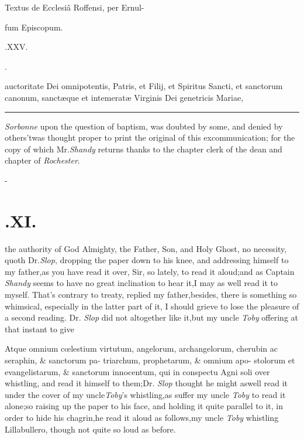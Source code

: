 \documentclass{article}
\begin{document}
\null\smallskip
\centerline{Textus de Ecclesiâ Roffensi, per Ernul-}
\centerline{fum Episcopum.}
\bigskip
\centerline{\large{}.\quad XXV.}
\bigskip
\centerline{\large{}.}

 auctoritate Dei omnipotentis, Patris, et Filij, et Spiritus Sancti, et
sanctorum canonum, sanctæque et intemeratæ Virginis Dei genetricis Mariae,

\vfill
\bgroup\fontsize{8}{10}\selectfont
\hrule
{} \textit{Sor\-bonne} upon the question of
baptism, was doubted by some, and denied by others\tsh ’twas
thought proper to print the original of this excommunication; for the copy of
which Mr.\@ \textit{Shandy} returns thanks to the chapter clerk of the dean and
chapter of \textit{Rochester}.\par
\egroup
{}
\newpage
\null\kern-\baselineskip
\section{.\quad  XI.}

the authority of God Almighty, the Father, Son, and Holy Ghost,
no necessity, quoth Dr.\@ \textit{Slop}, dropping the paper down to his knee, and
addressing himself to my father,\tsh as you have read it over, Sir, so lately, to
read it aloud;\tsk\break and as Captain \textit{Shandy} seems to have no great inclination
to hear it,\tsh I may as well read it to myself. That’s contrary to treaty, replied
my father,\tsk besides, there is something so whimsical, especially in the latter
part of it, I should grieve to lose the pleasure of a second reading.  Dr.\@
\textit{Slop} did not altogether like it,\tsh but my uncle \textit{Toby} offering at
that instant to give

\null\vfill
\quad\tsh Atque omnium cœlestium\break
virtutum, angelorum, archangelorum,\break
{}\break
cherubin ac seraphin, \& sanctorum pa-\break
triarchum, prophetarum, \& omnium apo-\break
stolorum et evangelistarum, \& sanctorum\break
innocentum, qui in conspectu Agni soli
over whistling, and read it himself to them;\tsh Dr.\@
\textit{Slop} thought he might as\break well read it under the cover
of my uncle\break \textit{Toby}’s whistling,\tsk as suffer my uncle
\textit{Toby} to read it alone;\tsh so raising up the paper to
his face, and holding it quite parallel to it, in order to hide
his chagrin,\tsk\break he read it aloud as follows,\tsh my uncle
\textit{Toby} whistling Lillabullero, though not quite so loud
as before.
\end{document}
